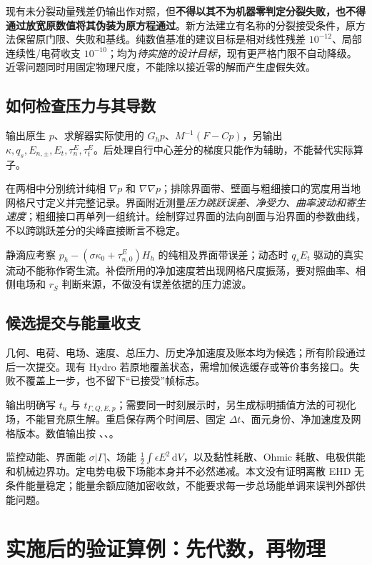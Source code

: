 \documentclass[UTF8,a4paper,11pt,fontset=fandol]{ctexart}
\numberwithin{equation}{section}
\newcommand{\dt}{\Delta t}\newcommand{\dd}{\,\mathrm d}
\begin{document}
现有未分裂动量残差仍输出作对照，但\textbf{不得以其不为机器零判定分裂失败，也不得通过放宽原数值将其伪装为原方程通过}。新方法建立有名称的分裂接受条件，原方法保留原门限、失败和基线。纯数值基准的建议目标是相对线性残差 $10^{-12}$、局部连续性/电荷收支 $10^{-10}$；均为\emph{待实施的设计目标}，现有更严格门限不自动降级。近零问题同时用固定物理尺度，不能除以接近零的解而产生虚假失效。

\subsection{如何检查压力与其导数}
输出原生 $p$、求解器实际使用的 $G_hp$、$M^{-1}(F-Cp)$，另输出 $\kappa,q_s,E_{n,\pm},E_t,\tau_n^E,\tau_t^E$。后处理自行中心差分的梯度只能作为辅助，不能替代实际算子。

在两相中分别统计纯相 $\nabla p$ 和 $\nabla\nabla p$；排除界面带、壁面与粗细接口的宽度用当地网格尺寸定义并完整记录。界面附近测量\emph{压力跳跃误差、净受力、曲率波动和寄生速度}；粗细接口再单列一组统计。绘制穿过界面的法向剖面与沿界面的参数曲线，不以跨跳跃差分的尖峰直接断言不稳定。

静滴应考察 $p_h-(\sigma\kappa_0+\tau_{n,0}^E)H_h$ 的纯相及界面带误差；动态时 $q_sE_t$ 驱动的真实流动不能称作寄生流。补偿所用的净加速度若出现网格尺度振荡，要对照曲率、相侧电场和 $r_S$ 判断来源，不做没有误差依据的压力滤波。

\subsection{候选提交与能量收支}
几何、电荷、电场、速度、总压力、历史净加速度及账本均为候选；所有阶段通过后一次提交。现有 Hydro 若原地覆盖状态，需增加候选缓存或等价事务接口。失败不覆盖上一步，也不留下“已接受”帧标志。

输出明确写 $t_u$ 与 $t_{\Gamma,Q,E,p}$；需要同一时刻展示时，另生成标明插值方法的可视化场，不能冒充原生解。重启保存两个时间层、固定 $\dt$、面元身份、净加速度及网格版本。数值输出按 、、。

监控动能、界面能 $\sigma|\Gamma|$、场能 $\frac12\int\epsilon E^2\dd V$，以及黏性耗散、Ohmic 耗散、电极供能和机械边界功。定电势电极下场能本身并不必然递减。本文没有证明离散 EHD 无条件能量稳定；能量余额应随加密收敛，不能要求每一步总场能单调来误判外部供能问题。

\section{实施后的验证算例：先代数，再物理}
\end{document}
